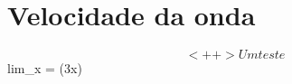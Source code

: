 \documentclass[12pt]{article}
\begin{document}
\section{Velocidade da onda}

$$<++>



Um teste

$$
lim_x  = \sin(3x)
$$
\end{document}
